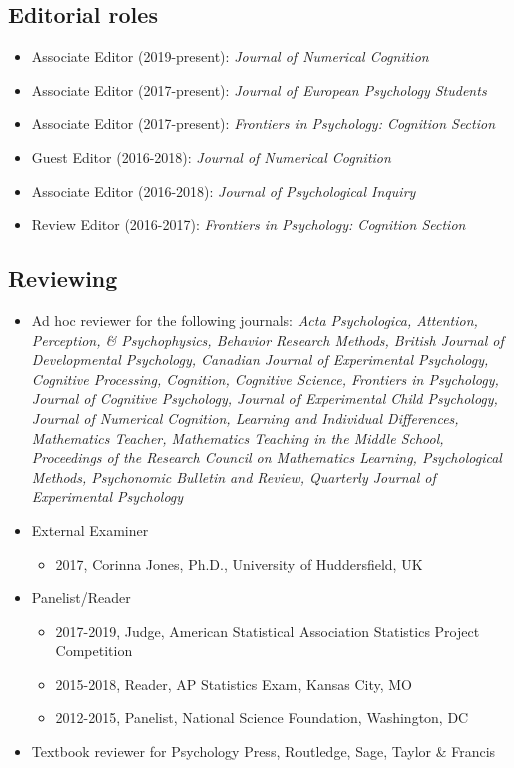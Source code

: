 \documentclass[article,10pt]{article}
\begin{document}
\subsection*{Editorial roles}
\label{sec:orgb68cbbf}
\begin{itemize}
\item Associate Editor (2019-present): \emph{Journal of Numerical Cognition}
\item Associate Editor (2017-present): \emph{Journal of European Psychology Students}
\item Associate Editor (2017-present): \emph{Frontiers in Psychology: Cognition Section}
\item Guest Editor (2016-2018): \emph{Journal of Numerical Cognition}
\item Associate Editor (2016-2018): \emph{Journal of Psychological Inquiry}
\item Review Editor (2016-2017): \emph{Frontiers in Psychology: Cognition Section}
\end{itemize}
\subsection*{Reviewing}
\label{sec:orge5e5007}

\begin{itemize}
\item Ad hoc reviewer for the following journals: \emph{Acta Psychologica, Attention, Perception, \& Psychophysics, Behavior Research Methods, British Journal of Developmental Psychology, Canadian Journal of Experimental Psychology, Cognitive Processing, Cognition, Cognitive Science, Frontiers in Psychology, Journal of Cognitive Psychology, Journal of Experimental Child Psychology, Journal of Numerical Cognition, Learning and Individual Differences, Mathematics Teacher, Mathematics Teaching in the Middle School, Proceedings of the Research Council on Mathematics Learning, Psychological Methods, Psychonomic Bulletin and Review, Quarterly Journal of Experimental Psychology}
\item External Examiner
\begin{itemize}
\item 2017, Corinna Jones, Ph.D., University of Huddersfield, UK
\end{itemize}
\item Panelist/Reader
\begin{itemize}
\item 2017-2019, Judge, American Statistical Association Statistics Project Competition
\item 2015-2018, Reader, AP Statistics Exam, Kansas City, MO
\item 2012-2015, Panelist, National Science Foundation, Washington, DC
\end{itemize}

\item Textbook reviewer for Psychology Press, Routledge, Sage, Taylor \& Francis
\end{itemize}
\end{document}
